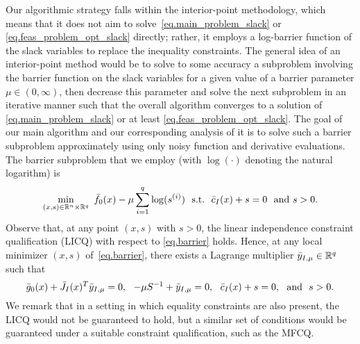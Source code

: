 Our algorithmic strategy falls within the interior-point methodology, which means that it does not aim to solve~\eqref{eq.main_problem_slack} or \eqref{eq.feas_problem_opt_slack} directly; rather, it employs a log-barrier function of the slack variables to replace the inequality constraints.  The general idea of an interior-point method would be to solve to some accuracy a subproblem involving the barrier function on the slack variables for a given value of a barrier parameter $\mu \in (0,\infty)$, then decrease this parameter and solve the next subproblem in an iterative manner such that the overall algorithm converges to a solution of \eqref{eq.main_problem_slack} or at least \eqref{eq.feas_problem_opt_slack}.  The goal of our main algorithm and our corresponding analysis of it is to solve such a barrier subproblem approximately using only noisy function and derivative evaluations.  The barrier subproblem that we employ (with $\log(\cdot)$ denoting the natural logarithm) is
\begin{align}\label{eq.barrier}
  \min_{(x,s) \in \mathbb{R}^n \times \mathbb{R}^q}\ {\bar f}_0(x) - \mu \sum_{i=1}^q \log(s^{(i)})\ \ \text{s.t.} \ \ {\bar c}_I(x) + s = 0\ \ \text{and $s > 0$}.
\end{align}
Observe that, at any point $(x,s)$ with $s > 0$, the linear independence constraint qualification (LICQ) with respect to \eqref{eq.barrier} holds.  Hence, at any local minimizer $(x,s)$ of~\eqref{eq.barrier}, there exists a Lagrange multiplier ${\bar y}_{I,\mu} \in \mathbb{R}^q$ such that
\begin{equation}\label{eq.first_order_opt}
  {\bar g}_0(x) + {\bar J}_I(x)^T {\bar y}_{I,\mu} = 0,\ \ -\mu S^{-1} + {\bar y}_{I,\mu} = 0,\ \ {\bar c}_I(x) + s = 0,\ \ \text{and}\ \ s > 0.
\end{equation}
We remark that in a setting in which equality constraints are also present, the LICQ would not be guaranteed to hold, but a similar set of conditions would be guaranteed under a suitable constraint qualification, such as the MFCQ.

